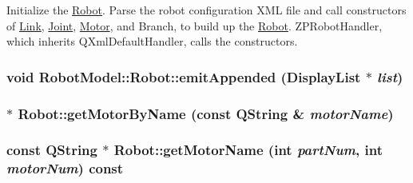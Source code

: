 Initialize the \hyperlink{class_robot_model_1_1_robot}{Robot}. Parse the robot configuration XML file and call constructors of \hyperlink{class_robot_model_1_1_link}{Link}, \hyperlink{class_robot_model_1_1_joint}{Joint}, \hyperlink{class_robot_model_1_1_motor}{Motor}, and Branch, to build up the \hyperlink{class_robot_model_1_1_robot}{Robot}. ZPRobotHandler, which inherits QXmlDefaultHandler, calls the constructors. \hypertarget{class_robot_model_1_1_robot_a4c006ead68b20137a28276920103667c}{
\subsubsection[{emitAppended}]{\setlength{\rightskip}{0pt plus 5cm}void RobotModel::Robot::emitAppended ({\bf DisplayList} $\ast$ {\em list})}}
\label{class_robot_model_1_1_robot_a4c006ead68b20137a28276920103667c}
\hypertarget{class_robot_model_1_1_robot_a41d959b8a9f469ee1caa5e3881a9445f}{
\subsubsection[{getMotorByName}]{ $\ast$ Robot::getMotorByName (const QString \& {\em motorName})}}
\label{class_robot_model_1_1_robot_a41d959b8a9f469ee1caa5e3881a9445f}
\hypertarget{class_robot_model_1_1_robot_a18b266083c6b87d05d1dc3479409e287}{
\subsubsection[{getMotorName}]{\setlength{\rightskip}{0pt plus 5cm}const QString $\ast$ Robot::getMotorName (int {\em partNum}, \/  int {\em motorNum}) const}}
\label{class_robot_model_1_1_robot_a18b266083c6b87d05d1dc3479409e287}


